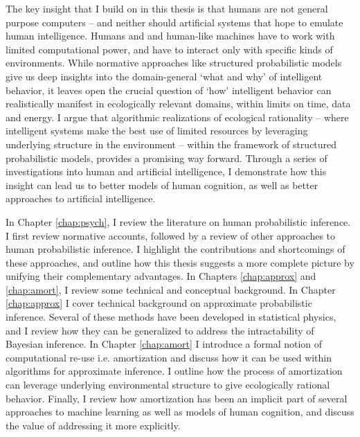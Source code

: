 The key insight that I build on in this thesis is that humans are not general purpose computers -- and neither should artificial systems that hope to emulate human intelligence. Humans and and human-like machines have to work with limited computational power, and have to interact only with specific kinds of environments. While normative approaches like structured probabilistic models give us deep insights into the domain-general `what and why' of intelligent behavior, it leaves open the crucial question of `how' intelligent behavior can realistically manifest in ecologically relevant domains, within limits on time, data and energy. I argue that algorithmic realizations of ecological rationality -- where intelligent systems make the best use of limited resources by leveraging underlying structure in the environment -- within the framework of structured probabilistic models, provides a promising way forward. Through a series of investigations into human and artificial intelligence, I demonstrate how this insight can lead us to better models of human cognition, as well as better approaches to artificial intelligence.

In Chapter \ref{chap:psych}, I review the literature on human probabilistic inference. I first review normative accounts, followed by a review of other approaches to human probabilistic inference. I highlight the contributions and shortcomings of these approaches, and outline how this thesis suggests a more complete picture by unifying their complementary advantages. In Chapters \ref{chap:approx} and \ref{chap:amort}, I review some technical and conceptual background. In Chapter \ref{chap:approx} I cover technical background on approximate probabilistic inference. Several of these methods have been developed in statistical physics, and I review how they can be generalized to address the intractability of Bayesian inference. In Chapter \ref{chap:amort} I introduce a formal notion of computational re-use i.e. amortization and discuss how it can be used within algorithms for approximate inference. I outline how the process of amortization can leverage underlying environmental structure to give ecologically rational behavior. Finally, I review how amortization has been an implicit part of several approaches to machine learning as well as models of human cognition, and discuss the value of addressing it more explicitly.


